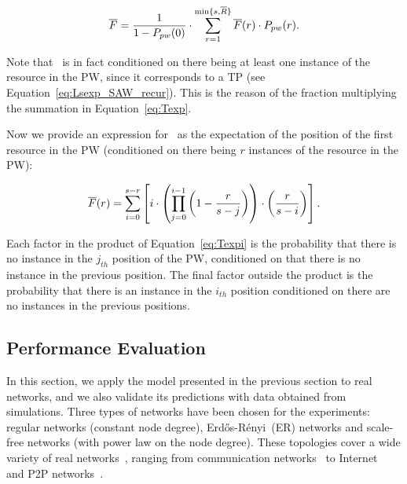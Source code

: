 \documentclass[]{elsarticle}
\newcommand{\ER}	{Erd\H{o}s-R\'{e}nyi}
\newcommand{\s}		{\ensuremath{s}}		\newcommand{\sopt}	{\ensuremath{s_{opt}}}		\newcommand{\p}		{\ensuremath{p}}		\newcommand{\W}		{\ensuremath{W}}		\newcommand{\w}		{\ensuremath{w}}		\newcommand{\lsave}	{\ensuremath{\overline{l}_s}}	\newcommand{\lave}	{\ensuremath{\overline{l}}}	\newcommand{\lopt}	{\ensuremath{\overline{l}_{opt}}}
\newcommand{\PWx}[1]    {\ensuremath{P_{pw}(#1)}}
\begin{document}
\begin{enumerate}
\begin{equation}
 \Texp = \frac{1}{1-\PWx{0}} \cdot \sum_{r=1}^{\mathrm{min}\{\s,\R\}} \Texpi{r} \cdot \PWx{r}. 
 \label{eq:Texp}
\end{equation}

\noindent Note that \Texp\ is in fact conditioned on there being at least one instance of the resource in the PW, since it corresponds to a TP (see Equation~\ref{eq:Lsexp_SAW_recur}). This is the reason of the fraction multiplying the summation in Equation~\ref{eq:Texp}.

Now we provide an expression for \ as the expectation of the position of the first resource in the PW (conditioned on there being $r$ instances of the resource in the PW):

\begin{equation}
 \overline{F}(r) = \sum_{i=0}^{s-r} \left[ i \cdot \left( \prod_{j=0}^{i-1} \left( 1-\frac{r}{s-j} \right)  \right) \cdot \left(\frac{r}{s-i}\right) \right].
 \label{eq:Texpi}
\end{equation}

\noindent Each factor in the product of Equation~\ref{eq:Texpi} is the probability that there is no instance in the $j_{th}$ position of the PW, conditioned on that there is no instance in the previous position. The final factor outside the product is the probability that there is an instance in the $i_{th}$ position conditioned on there are no instances in the previous positions. 

\end{enumerate}


\subsection{Performance Evaluation}

In this section, we apply the model presented in the previous section to real networks, and we also validate its predictions with data obtained from simulations. Three types of networks have been chosen for the experiments: regular networks (constant node degree), \ER\ (ER) networks and scale-free networks (with power law on the node degree). These topologies cover a wide variety of real networks~\cite{Albert2002}, ranging from communication networks~\cite{Aiello:2000:RGM:335305.335326} to Internet~\cite{Pastor-Satorras:2004:ESI:1076357} and P2P networks~\cite{Jovanovic:2001}.
\end{document}
